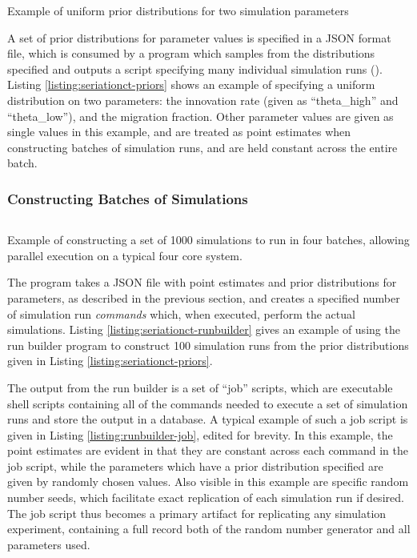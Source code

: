 \begin{listing}[!htp]
\inputminted{json}{objects/seriationct-priors.json}
\caption{Example of uniform prior distributions for two \seriationct simulation parameters}
\label{listing:seriationct-priors}
\end{listing}
 
A set of prior distributions for parameter values is specified in a JSON format file, which is consumed by a program which samples from the distributions specified and outputs a script specifying many individual simulation runs ().  Listing \ref{listing:seriationct-priors} shows an example of specifying a uniform distribution on two parameters:  the innovation rate (given as ``theta\_high'' and ``theta\_low''), and the migration fraction.  Other parameter values are given as single values in this example, and are treated as point estimates when constructing batches of simulation runs, and are held constant across the entire batch.

\subsubsection{Constructing Batches of \seriationct Simulations}

\begin{listing}[!htp]
\inputminted{bash}{objects/seriationct-runbuilder-example.sh}
\caption[Example of constructing a batch of \seriationct simulations to run in parallel]{Example of constructing a set of 1000 \seriationct simulations to run in four batches, allowing parallel execution on a typical four core system.}
\label{listing:seriationct-runbuilder}
\end{listing}

The  program takes a JSON file with point estimates and prior distributions for parameters, as described in the previous section, and creates a specified number of simulation run \emph{commands} which, when executed, perform the actual simulations.  Listing \ref{listing:seriationct-runbuilder} gives an example of using the run builder program to construct 100 simulation runs from the prior distributions given in Listing \ref{listing:seriationct-priors}.
 
The output from the run builder is a set of ``job'' scripts, which are executable shell scripts containing all of the commands needed to execute a set of simulation runs and store the output in a database.  A typical example of such a job script is given in Listing \ref{listing:runbuilder-job}, edited for brevity.  In this example, the point estimates are evident in that they are constant across each command in the job script, while the parameters which have a prior distribution specified are given by randomly chosen values.  Also visible in this example are specific random number seeds, which facilitate exact replication of each simulation run if desired.  The job script thus becomes a primary artifact for replicating any simulation experiment, containing a full record both of the random number generator and all parameters used.  

